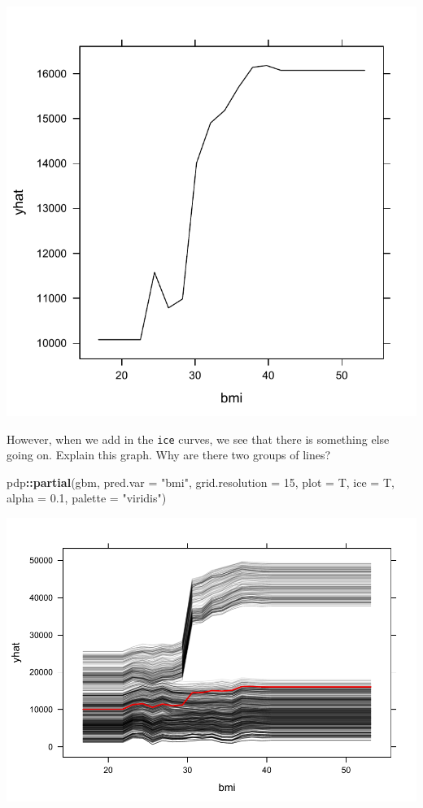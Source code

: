 \documentclass[openany]{book}
\newenvironment{Shaded}{\begin{snugshade}}{\end{snugshade}}
\newcommand{\DataTypeTok}[1]{\textcolor[rgb]{0.13,0.29,0.53}{#1}}
\newcommand{\DecValTok}[1]{\textcolor[rgb]{0.00,0.00,0.81}{#1}}
\newcommand{\FloatTok}[1]{\textcolor[rgb]{0.00,0.00,0.81}{#1}}
\newcommand{\KeywordTok}[1]{\textcolor[rgb]{0.13,0.29,0.53}{\textbf{#1}}}
\newcommand{\NormalTok}[1]{#1}
\newcommand{\OperatorTok}[1]{\textcolor[rgb]{0.81,0.36,0.00}{\textbf{#1}}}
\newcommand{\StringTok}[1]{\textcolor[rgb]{0.31,0.60,0.02}{#1}}
\begin{document}
\includegraphics{06-tree-based-models_files/figure-latex/unnamed-chunk-32-1.pdf}

However, when we add in the \texttt{ice} curves, we see that there is something else going on. Explain this graph. Why are there two groups of lines?

\begin{Shaded}
\begin{Highlighting}[]
\NormalTok{pdp}\OperatorTok{::}\KeywordTok{partial}\NormalTok{(gbm, }\DataTypeTok{pred.var =} \StringTok{"bmi"}\NormalTok{, }\DataTypeTok{grid.resolution =} \DecValTok{15}\NormalTok{, }\DataTypeTok{plot =}\NormalTok{ T, }\DataTypeTok{ice =}\NormalTok{ T, }\DataTypeTok{alpha =} \FloatTok{0.1}\NormalTok{, }\DataTypeTok{palette =} \StringTok{"viridis"}\NormalTok{)}
\end{Highlighting}
\end{Shaded}

\includegraphics{06-tree-based-models_files/figure-latex/unnamed-chunk-33-1.pdf}
\end{document}
